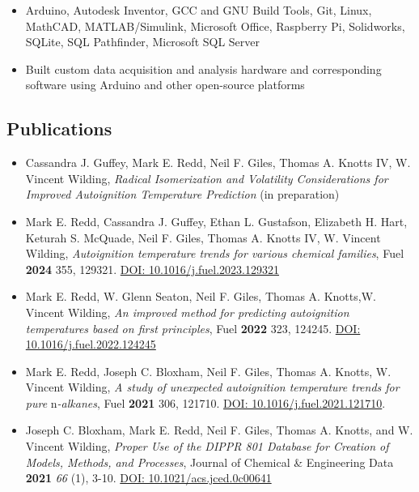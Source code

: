 \begin{itemize}
\tightlist
\item
  Arduino, Autodesk Inventor, GCC and GNU Build Tools, Git, Linux,
  MathCAD, MATLAB/Simulink, Microsoft Office, Raspberry Pi, Solidworks,
  SQLite, SQL Pathfinder, Microsoft SQL Server
\item
  Built custom data acquisition and analysis hardware and corresponding
  software using Arduino and other open-source platforms
\end{itemize}

\subsection{Publications}\label{publications}


\begin{itemize}
\item
  Cassandra J. Guffey, Mark E. Redd, Neil F. Giles, Thomas A. Knotts IV,
  W. Vincent Wilding, \emph{Radical Isomerization and Volatility
  Considerations for Improved Autoignition Temperature Prediction} (in
  preparation)
\item
  Mark E. Redd, Cassandra J. Guffey, Ethan L. Gustafson, Elizabeth H.
  Hart, Keturah S. McQuade, Neil F. Giles, Thomas A. Knotts IV, W.
  Vincent Wilding, \emph{Autoignition temperature trends for various
  chemical families}, Fuel \textbf{2024} 355, 129321.
  \href{https://doi.org/10.1016/j.fuel.2023.129321}{DOI:
  10.1016/j.fuel.2023.129321}
\item
  Mark E. Redd, W. Glenn Seaton, Neil F. Giles, Thomas A. Knotts,W.
  Vincent Wilding, \emph{An improved method for predicting autoignition
  temperatures based on first principles}, Fuel \textbf{2022} 323,
  124245. \href{https://doi.org/10.1016/j.fuel.2022.124245}{DOI:
  10.1016/j.fuel.2022.124245}
\item
  Mark E. Redd, Joseph C. Bloxham, Neil F. Giles, Thomas A. Knotts, W.
  Vincent Wilding, \emph{A study of unexpected autoignition temperature
  trends for pure} n\emph{-alkanes}, Fuel \textbf{2021} 306, 121710.
  \href{https://doi.org/10.1016/j.fuel.2021.121710}{DOI:
  10.1016/j.fuel.2021.121710}.
\item
  Joseph C. Bloxham, Mark E. Redd, Neil F. Giles, Thomas A. Knotts, and
  W. Vincent Wilding, \emph{Proper Use of the DIPPR 801 Database for
  Creation of Models, Methods, and Processes}, Journal of Chemical \&
  Engineering Data \textbf{2021} \emph{66} (1), 3-10.
  \href{https://doi.org/10.1021/acs.jced.0c00641}{DOI:
  10.1021/acs.jced.0c00641}
\end{itemize}

